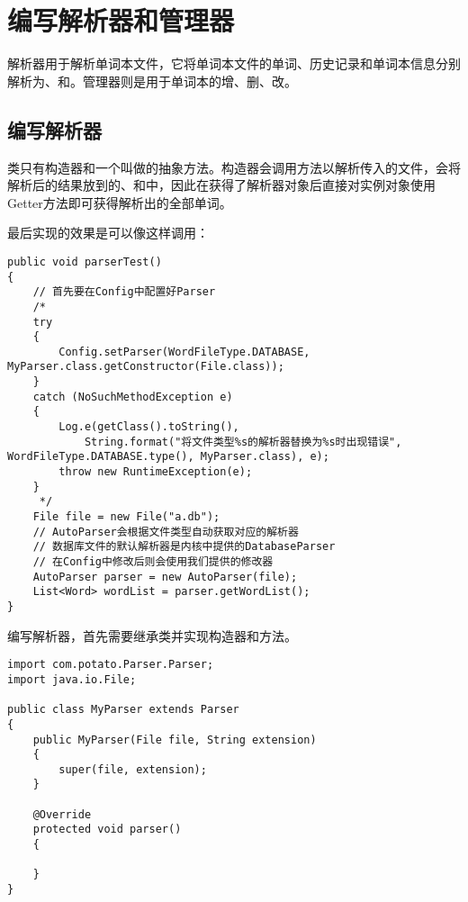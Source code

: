 \section[解析器和管理器]{编写解析器和管理器}\label{sec:解析器和管理器}

解析器用于解析单词本文件，它将单词本文件的单词、历史记录和单词本信息分别解析为、和。管理器则是用于单词本的增、删、改。

\subsection[解析器]{编写解析器}\label{subsec:解析器}

类只有构造器和一个叫做的抽象方法。构造器会调用方法以解析传入的文件，会将解析后的结果放到的、和中，因此在获得了解析器对象后直接对实例对象使用Getter方法即可获得解析出的全部单词。

最后实现的效果是可以像这样调用：

\begin{lstlisting}[style=Java, caption={示例},label={lst:Parser示例}]
public void parserTest()
{
    // 首先要在Config中配置好Parser
    /*
    try
    {
        Config.setParser(WordFileType.DATABASE, MyParser.class.getConstructor(File.class));
    }
    catch (NoSuchMethodException e)
    {
        Log.e(getClass().toString(),
            String.format("将文件类型%s的解析器替换为%s时出现错误", WordFileType.DATABASE.type(), MyParser.class), e);
        throw new RuntimeException(e);
    }
     */
    File file = new File("a.db");
    // AutoParser会根据文件类型自动获取对应的解析器
    // 数据库文件的默认解析器是内核中提供的DatabaseParser
    // 在Config中修改后则会使用我们提供的修改器
    AutoParser parser = new AutoParser(file);
    List<Word> wordList = parser.getWordList();
}
\end{lstlisting}

编写解析器，首先需要继承类并实现构造器和方法。

\begin{lstlisting}[style=Java, caption={初始布局},label={lst:Parser初始布局}]
import com.potato.Parser.Parser;
import java.io.File;

public class MyParser extends Parser
{
    public MyParser(File file, String extension)
    {
        super(file, extension);
    }

    @Override
    protected void parser()
    {

    }
}
\end{lstlisting}

